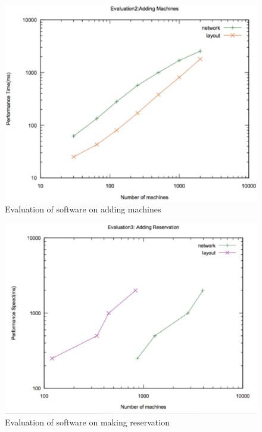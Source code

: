 \begin{figure}[h]
 \includegraphics[width=\linewidth]{addmachine.eps}
  \caption{Evaluation of software on adding machines}
  \label{fig:addmachine}
\end{figure}

\begin{figure}[h]
 \includegraphics[width=\linewidth]{addreservations.eps}
  \caption{Evaluation of software on making reservation}
\end{figure}